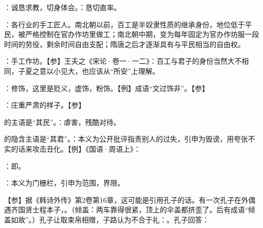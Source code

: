 {
\item {}：诚恳求教，切身体会。：恳切直率。
}
{}


{
\item {}：各行业的手工匠人。南北朝以前，百工是半奴隶性质的继承身份，地位低于平民，被严格控制在官办作坊里做工；南北朝中期，变为每年固定为官办作坊服一段时间的劳役，剩余时间自由支配；隋唐之后才逐渐具有与平民相当的自由权。
\item {}：手工作坊。【参】王夫之《宋论·卷一·一二》：百工与君子的身份当然大不相同，子夏之意以小见大，也应该从“所安”上理解。
}
{}


{
\item {}：修饰，这里是贬义，虚饰，粉饰。【例】成语“文过饰非”。【参】
}
{}


{
\item {}：庄重严肃的样子。【参】
}
{}


{
\item {}的主语是“其民”。：虐害，残酷对待。
\item {}的隐含主语是“其君”。：本义为公开批评指责别人的过失，引申为毁谤，用夸张不实的话来攻击丑化。【例】《国语·周语上》：
}
{}


{
\begin{lyitemize}
\item {}：即。
\item {}：本义为门栅栏，引申为范围，界限。
\end{lyitemize}
【参】据《韩诗外传》第2卷第16章，这可能是引用孔子的话。有一次孔子在外偶遇齐国贤士程本子，。（倾盖：两车靠得很紧，顶上的伞盖都挤歪了。后有成语“倾盖如故”。）孔子让取束帛相赠，子路认为不合于礼：。孔子回答：
}
{}


